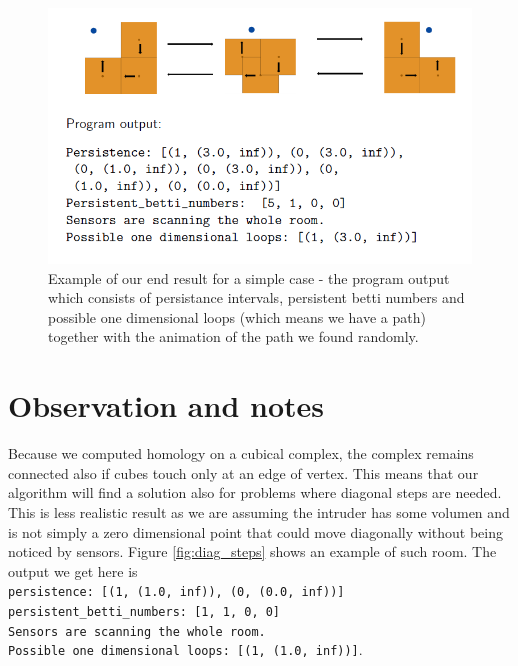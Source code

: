 \documentclass{article}
\begin{document}
\begin{figure}[!!h]
    \centering
    \includegraphics[width=1\textwidth]{our_example}
    \caption{Example of our end result for a simple case - the program output which consists of persistance intervals, persistent betti numbers and possible one dimensional loops (which means we have a path) together with the animation of the path we found randomly.}
    \label{fig:example}
\end{figure}


\section{Observation and notes}

Because we computed homology on a cubical complex, the complex remains connected also if cubes touch only at an edge of vertex. This means that our algorithm will find a solution also for problems where diagonal steps are needed. This is less realistic result as we are assuming the intruder has some volumen and is not simply a zero dimensional point that could move diagonally without being noticed by sensors. Figure \ref{fig:diag_steps} shows an example of such room. The output we get here is \\
\texttt{persistence:  [(1, (1.0, inf)), (0, (0.0, inf))] \\
persistent\_betti\_numbers:  [1, 1, 0, 0] \\
Sensors are scanning the whole room. \\
Possible one dimensional loops: [(1, (1.0, inf))]}.
\end{document}
